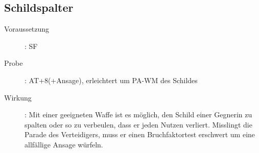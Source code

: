 \subsection{Schildspalter}
\label{aktion.schildspalter}
\begin{description}
    \item[Voraussetzung]:
        SF 
    \item[Probe]:
        AT+8(+Ansage), erleichtert um PA-WM des Schildes
    \item[Wirkung]:
        Mit einer geeigneten Waffe ist es möglich, den Schild einer Gegnerin zu spalten oder so zu verbeulen, dass er jeden Nutzen verliert.
        Misslingt die Parade des Verteidigers, muss er einen Bruchfaktortest erschwert um eine allfällige Ansage würfeln.
\end{description}
